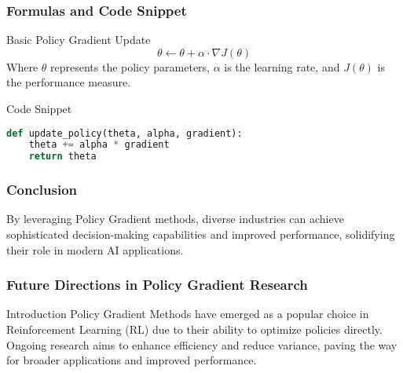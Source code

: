 \documentclass{beamer}
\begin{document}
\begin{frame}[fragile]
    \frametitle{Formulas and Code Snippet}
    \begin{block}{Basic Policy Gradient Update}
        \begin{equation}
            \theta \leftarrow \theta + \alpha \cdot \nabla J(\theta)
        \end{equation}
        Where \( \theta \) represents the policy parameters, \( \alpha \) is the learning rate, and \( J(\theta) \) is the performance measure.
    \end{block}
    
    \begin{block}{Code Snippet}
        \begin{lstlisting}[language=Python]
def update_policy(theta, alpha, gradient):
    theta += alpha * gradient
    return theta
        \end{lstlisting}
    \end{block}
\end{frame}

\begin{frame}[fragile]
    \frametitle{Conclusion}
    By leveraging Policy Gradient methods, diverse industries can achieve sophisticated decision-making capabilities and improved performance, solidifying their role in modern AI applications.
\end{frame}

\begin{frame}[fragile]
    \frametitle{Future Directions in Policy Gradient Research}
    \begin{block}{Introduction}
        Policy Gradient Methods have emerged as a popular choice in Reinforcement Learning (RL) due to their ability to optimize policies directly. Ongoing research aims to enhance efficiency and reduce variance, paving the way for broader applications and improved performance.
    \end{block}
\end{frame}
\end{document}
